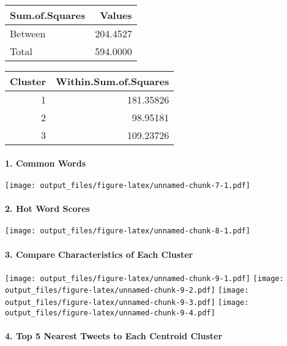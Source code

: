 \documentclass[]{article}
\let\oldparagraph\paragraph
\renewcommand{\paragraph}[1]{\oldparagraph{#1}\mbox{}}
\begin{document}
\begin{table}[H]
\centering
\begin{tabular}[t]{l|r}
\hline
Sum.of.Squares & Values\\
\hline
Between & 204.4527\\
\hline
Total & 594.0000\\
\hline
\end{tabular}
\end{table}

\begin{table}[H]
\centering
\begin{tabular}[t]{r|r}
\hline
Cluster & Within.Sum.of.Squares\\
\hline
1 & 181.35826\\
\hline
2 & 98.95181\\
\hline
3 & 109.23726\\
\hline
\end{tabular}
\end{table}

\paragraph{1. Common Words}\label{common-words}

\texttt{[image: output\_files/figure-latex/unnamed-chunk-7-1.pdf]}

\paragraph{2. Hot Word Scores}\label{hot-word-scores}

\texttt{[image: output\_files/figure-latex/unnamed-chunk-8-1.pdf]}

\paragraph{3. Compare Characteristics of Each
Cluster}\label{compare-characteristics-of-each-cluster}

\texttt{[image: output\_files/figure-latex/unnamed-chunk-9-1.pdf]}
\texttt{[image: output\_files/figure-latex/unnamed-chunk-9-2.pdf]}
\texttt{[image: output\_files/figure-latex/unnamed-chunk-9-3.pdf]}
\texttt{[image: output\_files/figure-latex/unnamed-chunk-9-4.pdf]}

\paragraph{4. Top 5 Nearest Tweets to Each Centroid
Cluster}\label{top-5-nearest-tweets-to-each-centroid-cluster}
\end{document}
